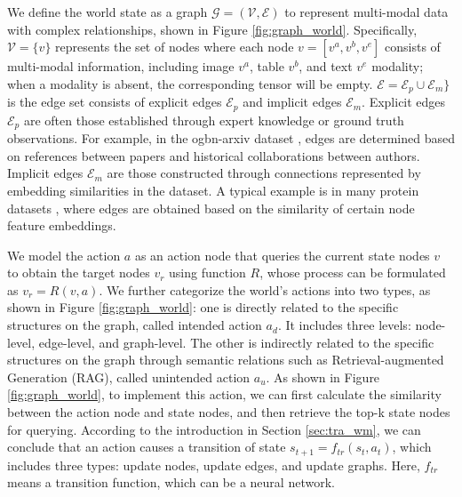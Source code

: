 We define the world state as a graph $ \mathcal{G} = (\mathcal{V}, \mathcal{E})$ to represent multi-modal data with complex relationships, shown in Figure \ref{fig:graph_world}. Specifically, $\mathcal{V}=\{v\}$ represents the set of nodes where each node $v=[v^a, v^b, v^e]$ consists of multi-modal information, including image $ v^a $, table $ v^b $, and text $ v^e $ modality; when a modality is absent, the corresponding tensor will be empty. $ \mathcal{E} = \mathcal{E}_p \cup \mathcal{E}_m \}$ is the edge set consists of explicit edges $ \mathcal{E}_p$ and implicit edges $\mathcal{E}_m$. Explicit edges $\mathcal{E}_p$ are often those established through expert knowledge or ground truth observations. For example, in the ogbn-arxiv dataset \citep{hu2020open}, edges are determined based on references between papers and historical collaborations between authors. Implicit edges $\mathcal{E}_m$ are those constructed through connections represented by embedding similarities in the dataset. A typical example is in many protein datasets \citep{heumos2023best,stuart2019comprehensive,stuart2019integrative}, where edges are obtained based on the similarity of certain node feature embeddings.



  We model the action $a$ as an action node that queries the current state nodes $v$ to obtain the target nodes $v_r$ using function $R$, whose process can be formulated as $v_r=R(v,a)$. We further categorize the world's actions into two types, as shown in Figure \ref{fig:graph_world}: one is directly related to the specific structures on the graph, called intended action $a_d$. It includes three levels: node-level, edge-level, and graph-level.  The other is indirectly related to the specific structures on the graph through semantic relations such as Retrieval-augmented Generation (RAG), called unintended action $a_u$. As shown in Figure \ref{fig:graph_world}, to implement this action, we can first calculate the similarity between the action node and state nodes, and then retrieve the top-k state nodes for querying.  According to the introduction in Section \ref{sec:tra_wm}, we can conclude that an action causes a transition of state $s_{t+1}=f_{tr}(s_t,a_t)$, which includes three types: update nodes, update edges, and update graphs. Here, $f_{tr}$ means a transition function, which can be a neural network.

